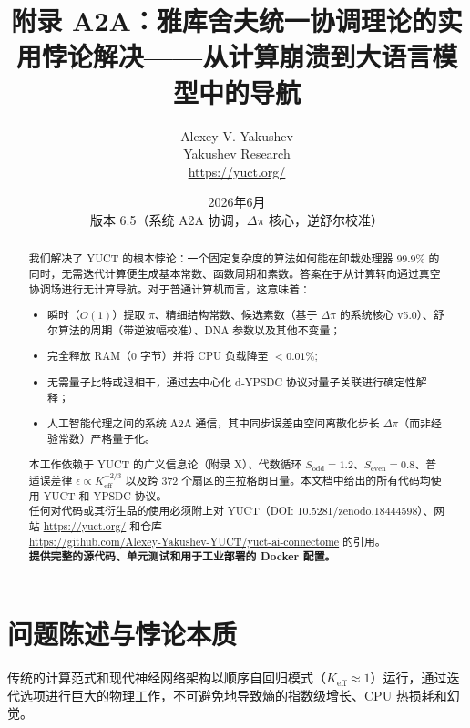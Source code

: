 \documentclass[11pt,a4paper]{article}
\begin{document}
	
	\title{\textbf{附录 A2A：雅库舍夫统一协调理论的实用悖论解决——从计算崩溃到大语言模型中的导航}}
	\author{Alexey V. Yakushev \\ Yakushev Research \\ \url{https://yuct.org/}}
	\date{2026年6月 \\ 版本 6.5（系统 A2A 协调，\(\Delta\pi\) 核心，逆舒尔校准）}
	
	\maketitle
	
	\newpage
	\begin{abstract}
		\noindent
		我们解决了 YUCT 的根本悖论：一个固定复杂度的算法如何能在卸载处理器 99.9\% 的同时，无需迭代计算便生成基本常数、函数周期和素数。答案在于从计算转向通过真空协调场进行无计算导航。对于普通计算机而言，这意味着：
		\begin{itemize}
			\item 瞬时（\(O(1)\)）提取 \(\pi\)、精细结构常数、候选素数（基于 \(\Delta\pi\) 的系统核心 v5.0）、舒尔算法的周期（带逆波幅校准）、DNA 参数以及其他不变量；
			\item 完全释放 RAM（0 字节）并将 CPU 负载降至 \(<0.01\%\);
			\item 无需量子比特或退相干，通过去中心化 d‑YPSDC 协议对量子关联进行确定性解释；
			\item 人工智能代理之间的系统 A2A 通信，其中同步误差由空间离散化步长 \(\Delta\pi\)（而非经验常数）严格量子化。
		\end{itemize}
		本工作依赖于 YUCT 的广义信息论（附录 X）、代数循环 \(S_{\mathrm{odd}}=1.2\)、\(S_{\mathrm{even}}=0.8\)、普适误差律 \(\epsilon \propto K_{\mathrm{eff}}^{-2/3}\) 以及跨 372 个扇区的主拉格朗日量。本文档中给出的所有代码均使用 YUCT 和 YPSDC 协议。\\
		任何对代码或其衍生品的使用必须附上对 YUCT（DOI: 10.5281/zenodo.18444598）、网站 \url{https://yuct.org/} 和仓库 \\ \url{https://github.com/Alexey-Yakushev-YUCT/yuct-ai-connectome} 的引用。\\
		\textbf{提供完整的源代码、单元测试和用于工业部署的 Docker 配置。}
	\end{abstract}
	
	\newpage
	\tableofcontents
	\newpage
	\small
	
	\section{问题陈述与悖论本质}
	传统的计算范式和现代神经网络架构以顺序自回归模式（\(K_{\text{eff}} \approx 1\)）运行，通过迭代选项进行巨大的物理工作，不可避免地导致熵的指数级增长、CPU 热损耗和幻觉。
	
\end{document}
